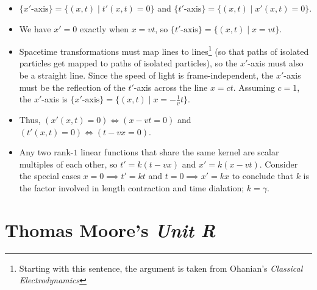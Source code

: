 \begin{itemize}
	\item $\{\text{$x'$-axis}\} = \{(x, t) \mid t'(x, t) = 0\}$ and $\{\text{$t'$-axis}\} = \{(x, t) \mid x'(x, t) = 0\}$. 
	\item We have $x' = 0$ exactly when $x = vt$, so $\{\text{$t'$-axis}\} = \{(x, t) \mid x = vt\}$.
	\item Spacetime transformations must map lines to lines\footnote{Starting with this sentence, the argument is taken from Ohanian's \textit{Classical Electrodynamics}} (so that paths of isolated particles get mapped to paths of isolated particles), so the $x'$-axis must also be a straight line. Since the speed of light is frame-independent, the $x'$-axis must be the reflection of the $t'$-axis across the line $x = ct$. Assuming $c = 1$, the $x'$-axis is $\{\text{$x'$-axis}\} = \{(x, t) \mid x = -\frac{1}{v}t \}$.
	\item Thus, $(x'(x, t) = 0) \iff (x - vt = 0)$ and $(t'(x, t) = 0) \iff (t - vx = 0)$.
	\item Any two rank-$1$ linear functions that share the same kernel are scalar multiples of each other, so $t' = k(t - vx)$ and $x' = k(x - vt)$. Consider the special cases $x = 0 \implies t' = kt$ and $t = 0 \implies x' = kx$ to conclude that $k$ is the factor involved in length contraction and time dialation; $k = \gamma$.
\end{itemize}

\newpage

\section*{Thomas Moore's \textit{Unit R}}

